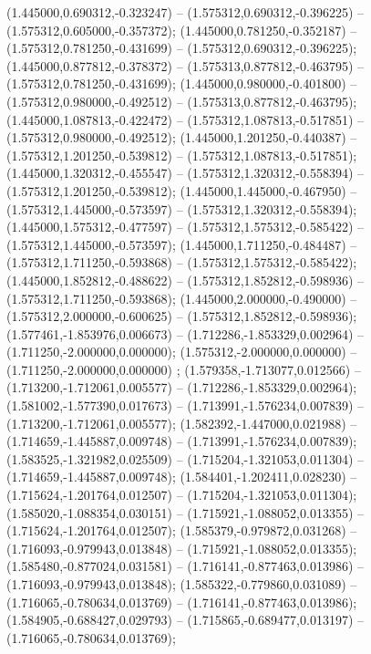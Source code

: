  (1.445000,0.690312,-0.323247) -- (1.575312,0.690312,-0.396225) -- (1.575312,0.605000,-0.357372);
 (1.445000,0.781250,-0.352187) -- (1.575312,0.781250,-0.431699) -- (1.575312,0.690312,-0.396225);
 (1.445000,0.877812,-0.378372) -- (1.575313,0.877812,-0.463795) -- (1.575312,0.781250,-0.431699);
 (1.445000,0.980000,-0.401800) -- (1.575312,0.980000,-0.492512) -- (1.575313,0.877812,-0.463795);
 (1.445000,1.087813,-0.422472) -- (1.575312,1.087813,-0.517851) -- (1.575312,0.980000,-0.492512);
 (1.445000,1.201250,-0.440387) -- (1.575312,1.201250,-0.539812) -- (1.575312,1.087813,-0.517851);
 (1.445000,1.320312,-0.455547) -- (1.575312,1.320312,-0.558394) -- (1.575312,1.201250,-0.539812);
 (1.445000,1.445000,-0.467950) -- (1.575312,1.445000,-0.573597) -- (1.575312,1.320312,-0.558394);
 (1.445000,1.575312,-0.477597) -- (1.575312,1.575312,-0.585422) -- (1.575312,1.445000,-0.573597);
 (1.445000,1.711250,-0.484487) -- (1.575312,1.711250,-0.593868) -- (1.575312,1.575312,-0.585422);
 (1.445000,1.852812,-0.488622) -- (1.575312,1.852812,-0.598936) -- (1.575312,1.711250,-0.593868);
 (1.445000,2.000000,-0.490000) -- (1.575312,2.000000,-0.600625) -- (1.575312,1.852812,-0.598936);
 (1.577461,-1.853976,0.006673) -- (1.712286,-1.853329,0.002964) -- (1.711250,-2.000000,0.000000);
 (1.575312,-2.000000,0.000000) -- (1.711250,-2.000000,0.000000) ;
 (1.579358,-1.713077,0.012566) -- (1.713200,-1.712061,0.005577) -- (1.712286,-1.853329,0.002964);
 (1.581002,-1.577390,0.017673) -- (1.713991,-1.576234,0.007839) -- (1.713200,-1.712061,0.005577);
 (1.582392,-1.447000,0.021988) -- (1.714659,-1.445887,0.009748) -- (1.713991,-1.576234,0.007839);
 (1.583525,-1.321982,0.025509) -- (1.715204,-1.321053,0.011304) -- (1.714659,-1.445887,0.009748);
 (1.584401,-1.202411,0.028230) -- (1.715624,-1.201764,0.012507) -- (1.715204,-1.321053,0.011304);
 (1.585020,-1.088354,0.030151) -- (1.715921,-1.088052,0.013355) -- (1.715624,-1.201764,0.012507);
 (1.585379,-0.979872,0.031268) -- (1.716093,-0.979943,0.013848) -- (1.715921,-1.088052,0.013355);
 (1.585480,-0.877024,0.031581) -- (1.716141,-0.877463,0.013986) -- (1.716093,-0.979943,0.013848);
 (1.585322,-0.779860,0.031089) -- (1.716065,-0.780634,0.013769) -- (1.716141,-0.877463,0.013986);
 (1.584905,-0.688427,0.029793) -- (1.715865,-0.689477,0.013197) -- (1.716065,-0.780634,0.013769);

